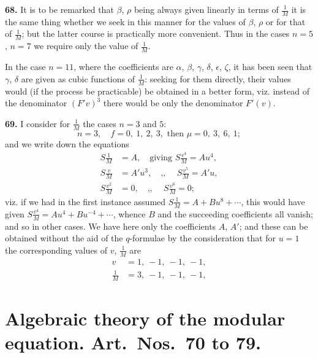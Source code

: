 \documentclass[12pt,a4paper]{article}
\begin{document}
\textbf{68.} It is to be remarked that $\beta$, $\rho$ being always given linearly in terms of $\frac{1}{M}$ it is the same thing whether we seek in this manner for the values of $\beta$, $\rho$ or for that of $\frac{1}{M}$; but the latter course is practically more convenient. Thus in the cases $n = 5$, $n = 7$ we require only the value of $\frac{1}{M}$.

In the case $n = 11$, where the coefficients are $\alpha$, $\beta$, $\gamma$, $\delta$, $\epsilon$, $\zeta$, it has been seen that $\gamma$, $\delta$ are given as cubic functions of $\frac{1}{M}$: seeking for them directly, their values would (if the process be practicable) be obtained in a better form, viz. instead of the denominator $(F'v)^3$ there would be only the denominator $F'(v)$.

\textbf{69.} I consider for $\frac{1}{M}$ the cases $n = 3$ and $5$:
\[
n = 3, \quad f = 0, \ 1, \ 2, \ 3, \text{ then } \mu = 0, \ 3, \ 6, \ 1;
\]
and we write down the equations
\begin{align*}
S\frac{1}{M} &= A, \quad \text{giving } S\frac{v^4}{M} = Au^4, \\
S\frac{v}{M} &= A'u^3, \quad \text{,, } \quad S\frac{v^5}{M} = A'u, \\
S\frac{v^2}{M} &= 0, \quad \text{,, } \quad S\frac{v^6}{M} = 0;
\end{align*}
viz. if we had in the first instance assumed $S\frac{1}{M} = A + Bu^8 + \cdots$, this would have given $S\frac{v^4}{M} = Au^4 + Bu^{-\!4} + \cdots$, whence $B$ and the succeeding coefficients all vanish; and so in other cases. We have here only the coefficients $A$, $A'$; and these can be obtained without the aid of the $q$-formulae by the consideration that for $u = 1$ the corresponding values of $v$, $\frac{1}{M}$ are
\begin{align*}
v &= 1, \ -1, \ -1, \ -1, \\
\frac{1}{M} &= 3, \ -1, \ -1, \ -1,
\end{align*}




\section*{Algebraic theory of the modular equation. Art.~Nos.~70 to 79.}
\end{document}
